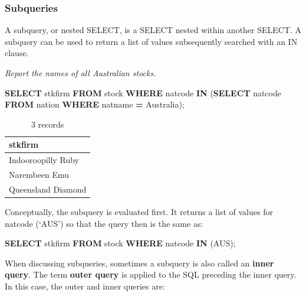 \documentclass[
]{article}
\newenvironment{Shaded}{\begin{snugshade}}{\end{snugshade}}
\newcommand{\KeywordTok}[1]{\textcolor[rgb]{0.13,0.29,0.53}{\textbf{#1}}}
\newcommand{\NormalTok}[1]{#1}
\newcommand{\OperatorTok}[1]{\textcolor[rgb]{0.81,0.36,0.00}{\textbf{#1}}}
\newcommand{\StringTok}[1]{\textcolor[rgb]{0.31,0.60,0.02}{#1}}
\begin{document}
\hypertarget{subqueries-1}{%
\subsubsection*{Subqueries}\label{subqueries-1}}

A subquery, or nested SELECT, is a SELECT nested within another SELECT.
A subquery can be used to return a list of values subsequently searched
with an IN clause.

\emph{Report the names of all Australian stocks.}

\begin{Shaded}
\begin{Highlighting}[]
\KeywordTok{SELECT}\NormalTok{ stkfirm }\KeywordTok{FROM}\NormalTok{ stock}
    \KeywordTok{WHERE}\NormalTok{ natcode }\KeywordTok{IN}
\NormalTok{        (}\KeywordTok{SELECT}\NormalTok{ natcode }\KeywordTok{FROM}\NormalTok{ nation}
            \KeywordTok{WHERE}\NormalTok{ natname }\OperatorTok{=} \StringTok{\textquotesingle{}Australia\textquotesingle{}}\NormalTok{);}
\end{Highlighting}
\end{Shaded}

\begin{table}

\caption{\label{tab:unnamed-chunk-52}3 records}
\centering
\begin{tabular}[t]{l}
\hline
stkfirm\\
\hline
Indooroopilly Ruby\\
\hline
Narembeen Emu\\
\hline
Queensland Diamond\\
\hline
\end{tabular}
\end{table}

Conceptually, the subquery is evaluated first. It returns a list of
values for natcode (`AUS') so that the query then is the same as:

\begin{Shaded}
\begin{Highlighting}[]
\KeywordTok{SELECT}\NormalTok{ stkfirm }\KeywordTok{FROM}\NormalTok{ stock}
    \KeywordTok{WHERE}\NormalTok{ natcode }\KeywordTok{IN}\NormalTok{ (}\StringTok{\textquotesingle{}AUS\textquotesingle{}}\NormalTok{);}
\end{Highlighting}
\end{Shaded}

When discussing subqueries, sometimes a subquery is also called an
\textbf{inner query}. The term \textbf{outer query} is applied to the SQL
preceding the inner query. In this case, the outer and inner queries
are:
\end{document}
